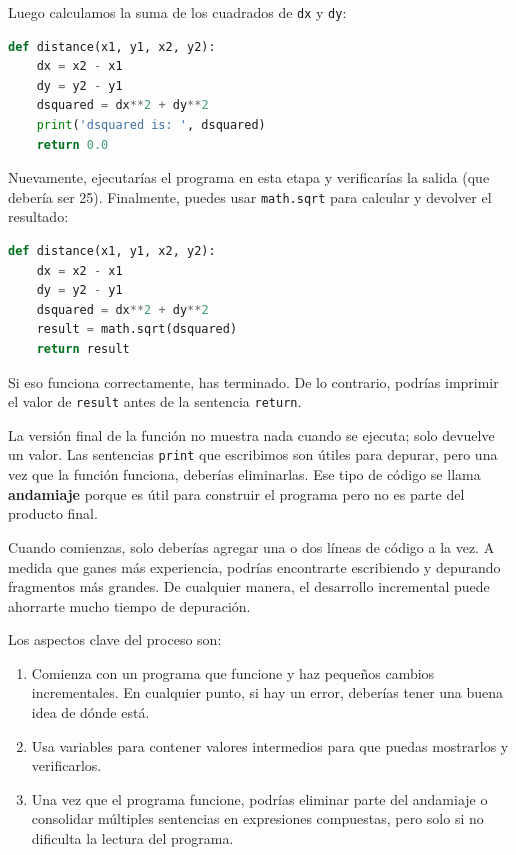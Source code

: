 Luego calculamos la suma de los cuadrados de \texttt{dx} y \texttt{dy}:

\begin{lstlisting}[language=Python]
def distance(x1, y1, x2, y2):
    dx = x2 - x1
    dy = y2 - y1
    dsquared = dx**2 + dy**2
    print('dsquared is: ', dsquared)
    return 0.0
\end{lstlisting}

Nuevamente, ejecutarías el programa en esta etapa y verificarías la salida (que debería ser 25). Finalmente, puedes usar \texttt{math.sqrt} para calcular y devolver el resultado:

\begin{lstlisting}[language=Python]
def distance(x1, y1, x2, y2):
    dx = x2 - x1
    dy = y2 - y1
    dsquared = dx**2 + dy**2
    result = math.sqrt(dsquared)
    return result
\end{lstlisting}

Si eso funciona correctamente, has terminado. De lo contrario, podrías imprimir el valor de \texttt{result} antes de la sentencia \texttt{return}.

La versión final de la función no muestra nada cuando se ejecuta; solo devuelve un valor. Las sentencias \texttt{print} que escribimos son útiles para depurar, pero una vez que la función funciona, deberías eliminarlas. Ese tipo de código se llama \textbf{andamiaje} porque es útil para construir el programa pero no es parte del producto final.

Cuando comienzas, solo deberías agregar una o dos líneas de código a la vez. A medida que ganes más experiencia, podrías encontrarte escribiendo y depurando fragmentos más grandes. De cualquier manera, el desarrollo incremental puede ahorrarte mucho tiempo de depuración.

Los aspectos clave del proceso son:

\begin{enumerate}
    \item Comienza con un programa que funcione y haz pequeños cambios incrementales. En cualquier punto, si hay un error, deberías tener una buena idea de dónde está.
    \item Usa variables para contener valores intermedios para que puedas mostrarlos y verificarlos.
    \item Una vez que el programa funcione, podrías eliminar parte del andamiaje o consolidar múltiples sentencias en expresiones compuestas, pero solo si no dificulta la lectura del programa.
\end{enumerate}

